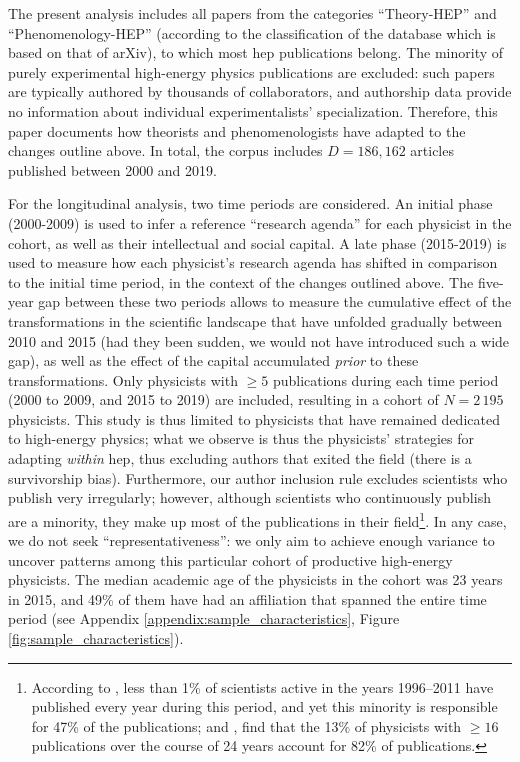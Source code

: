 \documentclass{article}
\begin{document}
The present analysis includes all papers from the categories ``Theory-HEP'' and ``Phenomenology-HEP'' (according to the classification of the database which is based on that of arXiv), to which most \gls{hep} publications belong. The minority of purely experimental high-energy physics publications are excluded: such papers are typically authored by thousands of collaborators, and authorship data provide no information about individual experimentalists' specialization. Therefore, this paper documents how theorists and phenomenologists have adapted to the changes outline above. In total, the corpus includes $D=186,162$ articles published between 2000 and 2019.

For the longitudinal analysis, two time periods are considered. An initial phase (2000-2009) is used to infer a reference ``research agenda'' for each physicist in the cohort, as well as their intellectual and social capital. A late phase (2015-2019) is used to measure how each physicist's research agenda has shifted in comparison to the initial time period, in the context of the changes outlined above. The five-year gap between these two periods allows to measure the cumulative effect of the transformations in the scientific landscape that have unfolded gradually between 2010 and 2015 (had they been sudden, we would not have introduced such a wide gap), as well as the effect of the capital accumulated \textit{prior} to these transformations. Only physicists with $\geq 5$ publications during each time period (2000 to 2009, and 2015 to 2019) are included, resulting in a cohort of $N=2\,195$ physicists. This study is thus limited to physicists that have remained dedicated to high-energy physics; what we observe is thus the physicists' strategies for adapting \textit{within} \gls{hep}, thus excluding authors that exited the field (there is a survivorship bias). Furthermore, our author inclusion rule excludes scientists who publish very irregularly; however, although scientists who continuously publish are a minority, they make up most of the publications in their field\footnote{According to  \citet{Ioannidis2014}, less than 1\% of scientists active in the years 1996–2011 have published every year during this period, and yet this minority is responsible for 47\% of the publications; and \citet{Feifan2023}, find that the 13\% of physicists with $\geq 16$ publications over the course of 24 years account for 82\% of publications.}. In any case, we do not seek ``representativeness'': we only aim to achieve enough variance to uncover patterns among this particular cohort of productive high-energy physicists. The median academic age of the physicists in the cohort was 23 years in 2015, and 49\% of them have had an affiliation that spanned the entire time period (see Appendix \ref{appendix:sample_characteristics}, Figure \ref{fig:sample_characteristics}). 
\end{document}
